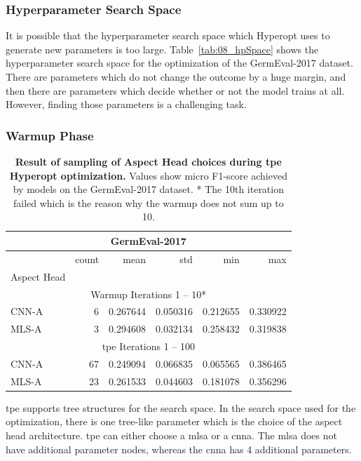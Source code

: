 \subsubsection*{Hyperparameter Search Space}

It is possible that the hyperparameter search space which Hyperopt uses to generate new parameters is too large. Table~\ref{tab:08_hpSpace} shows the hyperparameter search space for the optimization of the GermEval-2017 dataset. There are parameters which do not change the outcome by a huge margin, and then there are parameters which decide whether or not the model trains at all. However, finding those parameters is a challenging task.

\subsubsection*{Warmup Phase}
\label{sec:06_hp_warmup}
\begin{table}[]
    \centering
    \begin{tabular}{lrrrrr}
    \multicolumn{6}{c}{GermEval-2017} \\

    \toprule
    {} &  count &      mean &       std &       min &       max \\
    Aspect Head &        &           &           &           &           \\
    \midrule
    \multicolumn{6}{c}{Warmup Iterations 1 -- 10*} \\
    CNN-A    &    6 &  0.267644 &  0.050316 &  0.212655 &  0.330922 \\
    MLS-A    &    3 &  0.294608 &  0.032134 &  0.258432 &  0.319838 \\
    \midrule
    \multicolumn{6}{c}{\gls{tpe} Iterations 1 -- 100} \\
    CNN-A    &   67 &  0.249094 &  0.066835 &  0.065565 &  0.386465 \\
    MLS-A    &   23 &  0.261533 &  0.044603 &  0.181078 &  0.356296 \\
    \bottomrule
    \end{tabular}
    \caption{\textbf{Result of sampling of Aspect Head choices during \gls{tpe} Hyperopt optimization.} Values show micro F1-score achieved by models on the GermEval-2017 dataset. * The 10th iteration failed which is the reason why the warmup does not sum up to 10.}
    \label{tab:08_hpAspectHeadsSpace}    
\end{table}

\gls{tpe} supports tree structures for the search space. In the search space used for the optimization, there is one tree-like parameter which is the choice of the aspect head architecture. \gls{tpe} can either choose a \gls{mlsa} or a \gls{cnna}. The \gls{mlsa} does not have additional parameter nodes, whereas the \gls{cnna} has 4 additional parameters.
\medskip

